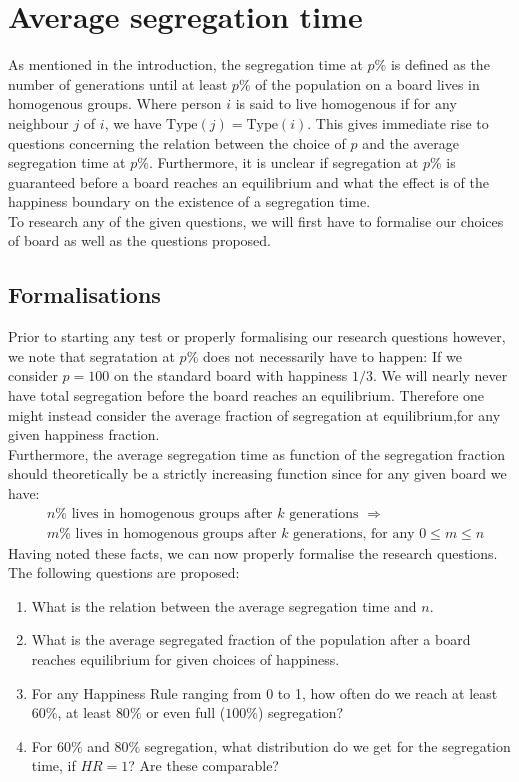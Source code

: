 
\section{Average segregation time}\label{sec:aveseg}
As mentioned in the introduction, the segregation time at \(p\%\) is defined as the number of generations until at least \(p\%\) of the population on a board lives in homogenous groups. 
Where person \(i\) is said to live homogenous if for any neighbour \(j\) of \(i\), we have \(\text{Type}(j)=\text{Type}(i)\).
This gives immediate rise to questions concerning the relation between the choice of \(p\) and the average segregation time at \(p\%\). 
Furthermore, it is unclear if segregation at \(p\%\) is guaranteed before a board reaches an equilibrium and what the effect is of the happiness boundary on the existence of a segregation time.\\

To research any of the given questions, we will first have to formalise our choices of board as well as the questions proposed.\\


\subsection{Formalisations}
Prior to starting any test or properly formalising our research questions however, we note that segratation at \(p\%\) does not necessarily have to happen: 
If we consider \(p=100\) on the standard board with happiness \(1/3\). We will nearly never have total segregation before the board reaches an equilibrium.
Therefore one might instead consider the average fraction of segregation at equilibrium,for any given happiness fraction. \\

Furthermore, the average segregation time as function of the segregation fraction should theoretically be a strictly increasing function since for any given board we have:
\begin{align*}
&n\% \text{ lives in homogenous groups after } k \text{ generations } \Rightarrow\\
& m\% \text{ lives in homogenous groups after } k \text{ generations, for any } 0 \leq m \leq n
\end{align*} 
Having noted these facts, we can now properly formalise the research questions.\\
The following questions are proposed:
\begin{enumerate}
 \item What is the relation between the average segregation time and \(n\).
 \item What is the average segregated fraction of the population after a board reaches equilibrium for given choices of happiness.
 \item For any Happiness Rule ranging from 0 to 1, how often do we reach at least $60\%$, at least $80\%$ or even full ($100\%$) segregation?
 \item For $60\%$ and $80\%$ segregation, what distribution do we get for the segregation time, if $HR = 1$? Are these comparable?
\end{enumerate}

